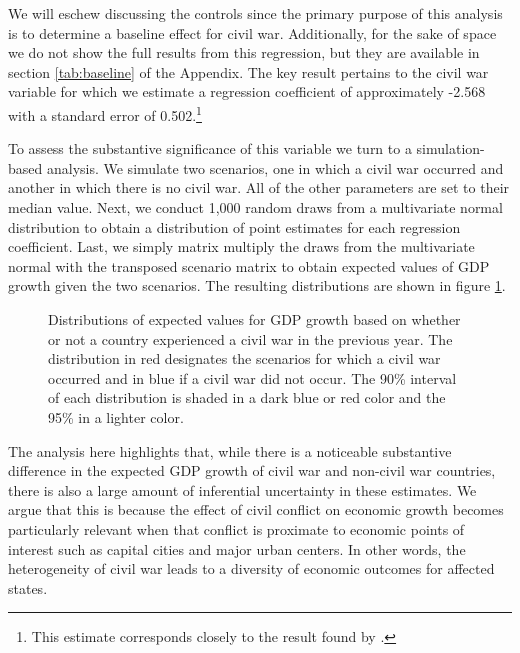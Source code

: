 
We will eschew discussing the controls since the primary purpose of this analysis is to determine a baseline effect for civil war. Additionally, for the sake of space we do not show the full results from this regression, but they are available in section \ref{tab:baseline} of the Appendix. The key result pertains to the civil war variable for which we estimate a regression coefficient of approximately -2.568 with a standard error of 0.502.\footnote{This estimate corresponds closely to the result found by \citet{collier:1999}.}

To assess the substantive significance of this variable we turn to a simulation-based analysis. We simulate two scenarios, one in which a civil war occurred and another in which there is no civil war.  All of the other parameters are set to their median value. Next, we conduct 1,000 random draws from a multivariate normal distribution to obtain a distribution of point estimates for each regression coefficient. Last, we simply matrix multiply the draws from the multivariate normal with the transposed scenario matrix to obtain expected values of GDP growth given the two scenarios. The resulting distributions are shown in figure \ref{fig:civWarEffect}. 

\begin{figure}
	\centering
	\resizebox{.6\textwidth}{!}{}
	\caption{Distributions of expected values for GDP growth based on whether or not a country experienced a civil war in the previous year. The distribution in red designates the scenarios for which a civil war occurred and in blue if a civil war did not occur. The 90\% interval of each distribution is shaded in a dark blue or red color and the 95\% in a lighter color.}
	\label{fig:civWarEffect}	
\end{figure}
\FloatBarrier

The analysis here highlights that, while there is a noticeable substantive difference in the expected GDP growth of civil war and non-civil war countries, there is also a large amount of inferential uncertainty in these estimates. We argue that this is because the effect of civil conflict on economic growth becomes particularly relevant when that conflict is proximate to economic points of interest such as capital cities and major urban centers. In other words, the heterogeneity of civil war leads to a diversity of economic outcomes for affected states.
%
